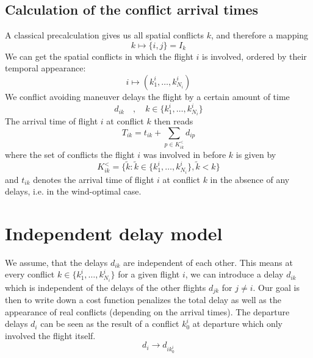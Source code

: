 \documentclass{article}
\begin{document}
\subsection{Calculation of the conflict arrival times}
A classical precalculation gives us all spatial conflicts $k$, and therefore a mapping
\begin{equation*}
    k \mapsto \{i, j\} = I_k
\end{equation*}
We can get the spatial conflicts in which the flight $i$ is involved, ordered by their temporal appearance:
\begin{equation*}
    i \mapsto (k^i_1, \dots, k^i_{N_i})
\end{equation*}
We conflict avoiding maneuver delays the flight by a certain amount of time
\begin{equation*}
    d_{ik} \quad, \quad  k\in\{k^i_1, \dots, k^i_{N_i}\}
\end{equation*}
The arrival time of flight $i$ at conflict $k$ then reads
\begin{equation*}
    T_{ik} = t_{ik} + \sum_{p \in K^<_{ik}} d_{ip}
\end{equation*}
where the set of conflicts the flight $i$ was involved in before $k$ is given by
\begin{equation*}
    K^<_{ik} = \{\tilde k : \tilde k \in\{k^i_1, \dots, k^i_{N_i}\}, \tilde k < k\}
\end{equation*}
and $t_{ik}$ denotes the arrival time of flight $i$ at conflict $k$ in the absence of any delays, i.e. in the wind-optimal case.

\section{Independent delay model}
We assume, that the delays $d_{ik}$ are independent of each other. 
This means at every conflict $k \in  \{k^i_1, \dots, k^i_{N_i}\}$ for a given flight $i$, we can introduce a delay $d_{ik}$ which is independent of the delays of the other flights $d_{jk}$ for $j\neq i$.
Our goal is then to write down a cost function penalizes the total delay as well as the appearance of real conflicts (depending on the arrival times).
The departure delays $d_i$ can be seen as the result of a conflict $k^i_0$ at departure which only involved the flight itself.
\begin{equation*}
    d_i \to d_{ik^i_0}
\end{equation*}
\end{document}
